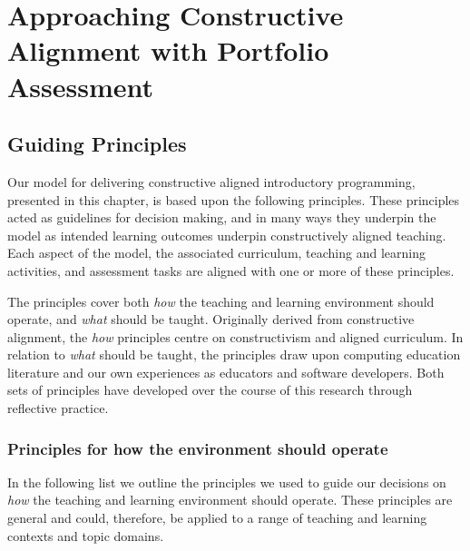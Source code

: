 
\chapter{Approaching Constructive Alignment with Portfolio Assessment} %
\label{cha:approach}

\graphicspath{{Figures/CAApproach/}}

\section{Guiding Principles} %
\label{sec:guiding_principles}

Our model for delivering constructive aligned introductory programming, presented in this chapter, is based upon the following principles. These principles acted as guidelines for decision making, and in many ways they underpin the model as intended learning outcomes underpin constructively aligned teaching. Each aspect of the model, the associated curriculum, teaching and learning activities, and assessment tasks are aligned with one or more of these principles.

The principles cover both \emph{how} the teaching and learning environment should operate, and \emph{what} should be taught. Originally derived from constructive alignment, the \emph{how} principles centre on constructivism and aligned curriculum. In relation to \emph{what} should be taught, the principles draw upon computing education literature and our own experiences as educators and software developers. Both sets of principles have developed over the course of this research through reflective practice.

\subsection{Principles for how the environment should operate} %
\label{sub:principles_for_how_the_environment_should_operate}

In the following list we outline the principles we used to guide our decisions on \emph{how} the teaching and learning environment should operate. These principles are general and could, therefore, be applied to a range of teaching and learning contexts and topic domains.

